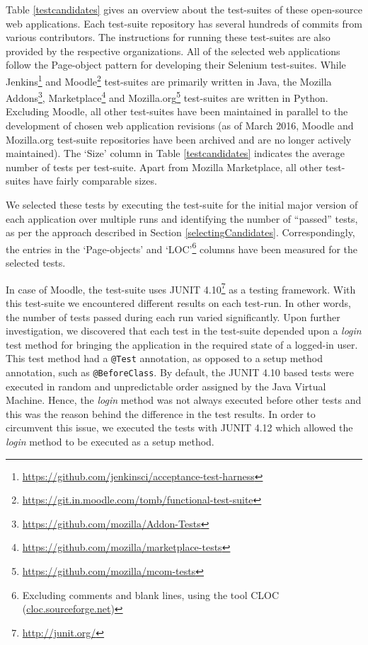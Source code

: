 Table \ref{testcandidates} gives an overview about the test-suites of these open-source web applications. Each test-suite repository has several hundreds of commits from various contributors. The instructions for running these test-suites are also provided by the respective organizations. All of the selected web applications follow the Page-object pattern for developing their Selenium test-suites. While Jenkins\footnote{\url{https://github.com/jenkinsci/acceptance-test-harness}} and Moodle\footnote{\url{https://git.in.moodle.com/tomb/functional-test-suite}} test-suites are primarily written in Java, the Mozilla Addons\footnote{\url{https://github.com/mozilla/Addon-Tests}}, Marketplace{\footnote{\url{https://github.com/mozilla/marketplace-tests}}} and Mozilla.org\footnote{\url{https://github.com/mozilla/mcom-tests}} test-suites are written in Python.
Excluding Moodle, all other test-suites have been maintained in parallel to the development of chosen web application revisions 
(as of March 2016, Moodle and Mozilla.org test-suite repositories have been archived and are no longer actively maintained). The `Size' column in Table \ref{testcandidates} indicates the average number of tests per test-suite. Apart from Mozilla Marketplace, all other test-suites have fairly comparable sizes.

We selected these tests by executing the test-suite for the initial major version of each application over multiple runs and identifying the number of ``passed'' tests, as per the approach described in Section \ref{selectingCandidates}. Correspondingly, the entries in the `Page-objects' and `LOC'\footnote{Excluding comments and blank lines, using the tool CLOC (\url{cloc.sourceforge.net})} columns have been measured for the selected tests.

In case of Moodle, the test-suite uses JUNIT 4.10\footnote{\url{http://junit.org/}} as a testing framework. With this test-suite we encountered different results on each test-run. In other words, the number of tests passed during each run varied significantly. Upon further investigation, we discovered that each test in the test-suite depended upon a \textit{login} test method for bringing the application in the required state of a logged-in user. This test method had a \texttt{@Test} annotation, as opposed to a setup method annotation, such as \texttt{@BeforeClass}. By default, the JUNIT 4.10 based tests were executed in random and unpredictable order assigned by the Java Virtual Machine. Hence, the \textit{login} method was not always executed before other tests and this was the reason behind the difference in the test results. In order to circumvent this issue, we executed the tests with JUNIT 4.12 which allowed the \textit{login} method to be executed as a setup method. 


